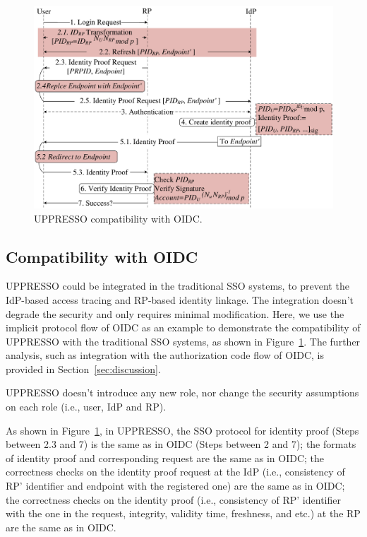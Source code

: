 \begin{figure}[t]
  \centering
  \includegraphics[width=\linewidth]{fig/overview1.pdf}
  \caption{UPPRESSO compatibility with OIDC.}
  \label{fig:UPPRESSO}
\end{figure}

\subsection{Compatibility with OIDC}
\label{subsec:compatible}
UPPRESSO could be integrated in the traditional SSO systems, to  prevent the IdP-based access tracing and RP-based identity linkage.
The integration doesn't degrade the security and only requires minimal modification.
Here, we use the implicit protocol flow of OIDC as an example to demonstrate the compatibility of UPPRESSO with the traditional SSO systems, as shown in Figure~\ref{fig:UPPRESSO}.
The further analysis, such as integration with the authorization code flow of OIDC,  is provided in Section~\ref{sec:discussion}.

UPPRESSO doesn't introduce any new role, nor change the security assumptions on each role (i.e., user, IdP and RP).

As shown in Figure~\ref{fig:UPPRESSO}, in UPPRESSO, the SSO protocol for identity proof  (Steps between 2.3 and 7) is the same as in OIDC (Steps between 2 and 7); the formats of identity proof and corresponding request are the same as in OIDC; the correctness checks on the identity proof request at the IdP (i.e., consistency of RP' identifier and endpoint with the registered one) are the same as in OIDC; the correctness checks on the identity proof (i.e., consistency of RP' identifier with the one in the request, integrity, validity time, freshness, and etc.) at the RP are the same as in OIDC.

